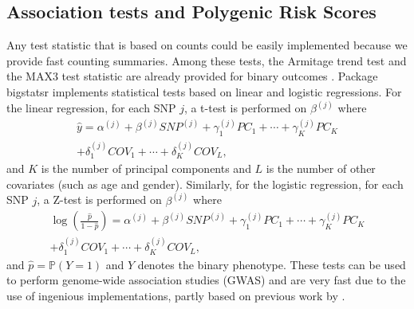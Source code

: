 \documentclass{bioinfo}
\begin{document}
\begin{methods}
\subsection{Association tests and Polygenic Risk Scores}

Any test statistic that is based on counts could be easily implemented because we provide fast counting summaries. Among these tests, the Armitage trend test and the MAX3 test statistic are already provided for binary outcomes \cite[]{Zheng2012}. 
Package bigstatsr implements statistical tests based on linear and logistic regressions. For the linear regression, for each SNP $j$, a t-test is performed on $\beta^{(j)}$ where
\begin{multline}
  \hat{y} = \alpha^{(j)} + \beta^{(j)} SNP^{(j)} + \gamma_1^{(j)} PC_1 + \cdots + \gamma_K^{(j)} PC_K \\ + \delta_1^{(j)} COV_1 + \cdots + \delta_K^{(j)} COV_L,
\end{multline}
and $K$ is the number of principal components and $L$ is the number of other covariates (such as age and gender). Similarly, for the logistic regression, for each SNP $j$, a Z-test is performed on $\beta^{(j)}$ where
\begin{multline}
  \log{\left(\frac{\hat{p}}{1-\hat{p}}\right)} = \alpha^{(j)} + \beta^{(j)} SNP^{(j)} + \gamma_1^{(j)} PC_1 + \cdots + \gamma_K^{(j)} PC_K \\ + \delta_1^{(j)} COV_1 + \cdots + \delta_K^{(j)} COV_L,
\end{multline}
and $\hat{p} = \mathbb{P}(Y = 1)$ and $Y$ denotes the binary phenotype.
{\color{red}
These tests can be used to perform genome-wide association studies (GWAS) and are very fast due to the use of ingenious implementations, partly based on previous work by \cite{sikorska2013gwas}. 
}


\end{methods}
\end{document}

